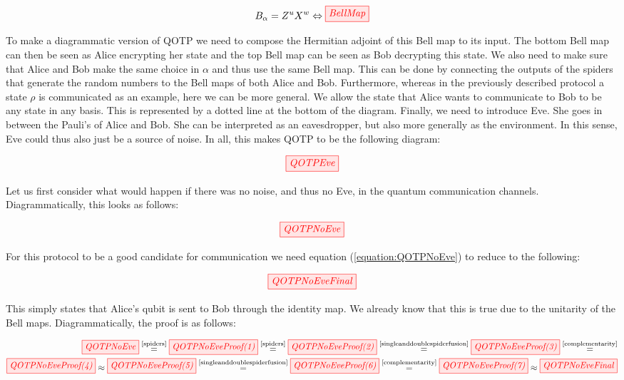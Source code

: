 \documentclass[]{article}
\newcommand{\equaltext}[1]{\ensuremath{\stackrel{\text{#1}}{=}}}
\begin{document}
\begin{equation}
	\label{equation:BellMap}
	B_\alpha = Z^uX^w \Leftrightarrow \tikzfig{BellMap}
\end{equation}

To make a diagrammatic version of QOTP we need to compose the Hermitian adjoint of this Bell map to its input. The bottom Bell map can then be seen as Alice encrypting her state and the top Bell map can be seen as Bob decrypting this state. We also need to make sure that Alice and Bob make the same choice in $\alpha$ and thus use the same Bell map. This can be done by connecting the outputs of the spiders that generate the random numbers to the Bell maps of both Alice and Bob. Furthermore, whereas in the previously described protocol a state $\rho$ is communicated as an example, here we can be more general. We allow the state that Alice wants to communicate to Bob to be any state in any basis. This is represented by a dotted line at the bottom of the diagram. Finally, we need to introduce Eve. She goes in between the Pauli's of Alice and Bob. She can be interpreted as an eavesdropper, but also more generally as the environment. In this sense, Eve could thus also just be a source of noise. In all, this makes QOTP to be the following diagram:

\begin{equation}
\tikzfig{QOTPEve}
\label{equation:QOTPEve}
\end{equation}

Let us first consider what would happen if there was no noise, and thus no Eve, in the quantum communication channels. Diagrammatically, this looks as follows:

\begin{equation}
	\tikzfig{QOTPNoEve}
	\label{equation:QOTPNoEve}
\end{equation}

For this protocol to be a good candidate for communication we need equation (\ref{equation:QOTPNoEve}) to reduce to the following: 

\begin{equation}
	\tikzfig{QOTPNoEveFinal}
\end{equation}

This simply states that Alice's qubit is sent to Bob through the identity map. We already know that this is true due to the unitarity of the Bell maps. Diagrammatically, the proof is as follows:

\begin{equation}
	\begin{split}
	\tikzfig{QOTPNoEve} \equaltext{\ref{spiders}} 
	\tikzfig{QOTPNoEveProof(1)} \equaltext{\ref{spiders}}
	\tikzfig{QOTPNoEveProof(2)} \equaltext{\ref{singleanddoublespiderfusion}}
	\tikzfig{QOTPNoEveProof(3)} \equaltext{\ref{complementarity}} \\
	\tikzfig{QOTPNoEveProof(4)} \approx
	\tikzfig{QOTPNoEveProof(5)} \equaltext{\ref{singleanddoublespiderfusion}}
	\tikzfig{QOTPNoEveProof(6)} \equaltext{\ref{complementarity}}
	\tikzfig{QOTPNoEveProof(7)} \approx
	\tikzfig{QOTPNoEveFinal}
	\end{split}
\end{equation}
\end{document}
